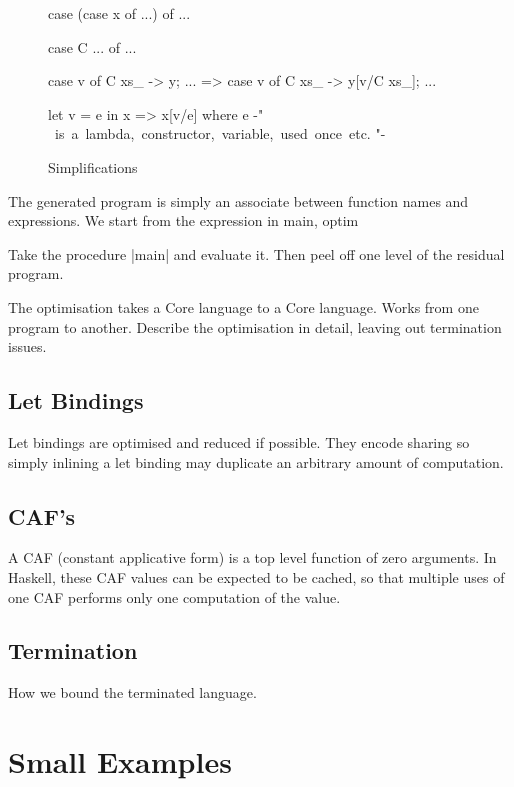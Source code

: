 \documentclass{llncs}
\begin{document}
\begin{figure}[tb]
\begin{code}
case (case x of ...) of ...

case C ... of ...

case v of {C xs_ -> y; ...} => case v of {C xs_ -> y[v/C xs_]; ...}

let v = e in x => x[v/e]
   where e {-" \hbox{ is a lambda, constructor, variable, used once etc.} "-}
\end{code}
\caption{Simplifications}
\label{fig:simplify}
\end{figure}

The generated program is simply an associate between function names and expressions. We start from the expression in main, optim

Take the procedure |main| and evaluate it. Then peel off one level of the residual program.





The optimisation takes a Core language to a Core language. Works from one program to another. Describe the optimisation in detail, leaving out termination issues.

\subsection{Let Bindings}

Let bindings are optimised and reduced if possible. They encode sharing so simply inlining a let binding may duplicate an arbitrary amount of computation. 

\subsection{CAF's}
\label{sec:caf}

A CAF (constant applicative form) is a top level function of zero arguments. In Haskell, these CAF values can be expected to be cached, so that multiple uses of one CAF performs only one computation of the value.


\subsection{Termination}

How we bound the terminated language.

\section{Small Examples}
\end{document}

